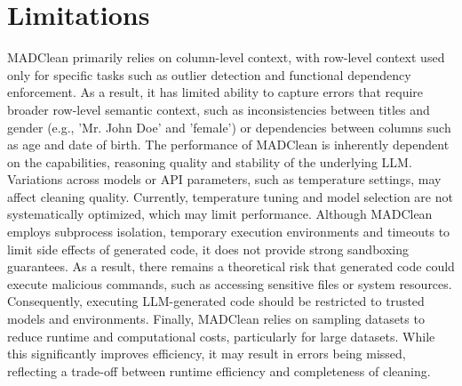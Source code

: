 \section{Limitations}
MADClean primarily relies on column-level context, with row-level context used only for specific tasks such as outlier detection and functional dependency enforcement. 
As a result, it has limited ability to capture errors that require broader row-level semantic context, such as inconsistencies between titles and gender (e.g., 'Mr. John Doe' and 'female') or dependencies between columns such as age and date of birth.
\newline\newline
The performance of MADClean is inherently dependent on the capabilities, reasoning quality and stability of the underlying LLM. 
Variations across models or API parameters, such as temperature settings, may affect cleaning quality. 
Currently, temperature tuning and model selection are not systematically optimized, which may limit performance.
\newline\newline
Although MADClean employs subprocess isolation, temporary execution environments and timeouts to limit side effects of generated code, it does not provide strong sandboxing guarantees. 
As a result, there remains a theoretical risk that generated code could execute malicious commands, such as accessing sensitive files or system resources. 
Consequently, executing LLM-generated code should be restricted to trusted models and environments. 
\newline\newline
Finally, MADClean relies on sampling datasets to reduce runtime and computational costs, particularly for large datasets. 
While this significantly improves efficiency, it may result in errors being missed, reflecting a trade-off between runtime efficiency and completeness of cleaning.

